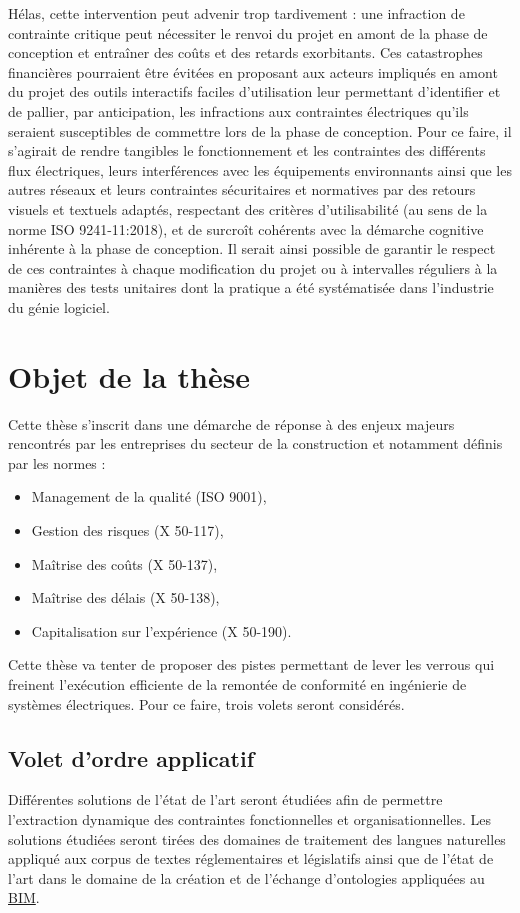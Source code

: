 \documentclass[a4paper,12pt]{article}
\begin{document}
Hélas, cette intervention peut advenir trop tardivement : une infraction de contrainte critique peut nécessiter le renvoi du projet en amont de la phase de conception et entraîner des coûts et des retards exorbitants. Ces catastrophes financières pourraient être évitées en proposant aux acteurs impliqués en amont du projet des outils interactifs faciles d'utilisation leur permettant d'identifier et de pallier, par anticipation, les infractions aux contraintes électriques qu'ils seraient susceptibles de commettre lors de la phase de conception. Pour ce faire, il s'agirait de rendre tangibles le fonctionnement et les contraintes des différents flux électriques, leurs interférences avec les équipements environnants ainsi que les autres réseaux et leurs contraintes sécuritaires et normatives par des retours visuels et textuels adaptés, respectant des critères d'utilisabilité (au sens de la norme ISO 9241-11:2018), et de surcroît cohérents avec la démarche cognitive inhérente à la phase de conception. Il serait ainsi possible de garantir le respect de ces contraintes à chaque modification du projet ou à intervalles réguliers à la manières des tests unitaires dont la pratique a été systématisée dans l'industrie du génie logiciel.
\section{Objet de la thèse}
\label{sec:org800d082}
Cette thèse s'inscrit dans une démarche de réponse à des enjeux majeurs rencontrés par les entreprises du secteur de la construction \autocite{guillouSegmentationDansEntreprises2003b} et notamment définis par les normes :
\begin{itemize}
\item Management de la qualité (ISO 9001),
\item Gestion des risques (X 50-117),
\item Maîtrise des coûts (X 50-137),
\item Maîtrise des délais (X 50-138),
\item Capitalisation sur l'expérience (X 50-190).
\end{itemize}

Cette thèse va tenter de proposer des pistes permettant de lever les verrous qui freinent l'exécution efficiente de la remontée de conformité en ingénierie de systèmes électriques. Pour ce faire, trois volets seront considérés.
\subsection{Volet d'ordre applicatif}
\label{sec:org4e7723e}
Différentes solutions de l'état de l'art seront étudiées afin de permettre l'extraction dynamique des contraintes fonctionnelles et organisationnelles. Les solutions étudiées seront tirées des domaines de traitement des langues naturelles appliqué aux corpus de textes réglementaires et législatifs ainsi que de l'état de l'art dans le domaine de la création et de l'échange d'ontologies appliquées au \protect\hyperlink{gls-1}{\label{gls-1-use-3}BIM}.
\end{document}
